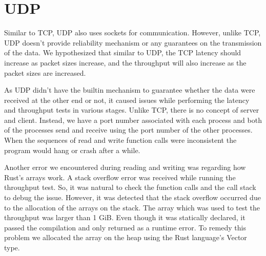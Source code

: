 
\section{UDP}

Similar to TCP, UDP also uses sockets for communication. However, unlike TCP, UDP doesn't provide reliability mechanism or any guarantees on the transmission of the data. We hypothesized that similar to UDP, the TCP latency should increase as packet sizes increase, and the throughput will also increase as the packet sizes are increased.

As UDP didn't have the builtin mechanism to guarantee whether the data were received at the other end or not, it caused issues while performing the latency and throughput tests in various stages. Unlike TCP, there is no concept of server and client. Instead, we have a port number associated with each process and both of the processes send and receive using the port number of the other processes. When the sequences of read and write function calls were inconsistent the program would hang or crash after a while.  

Another error we encountered during reading and writing was regarding how Rust's arrays work. A stack overflow error was received while running the throughput test. So, it was natural to check the function calls and the call stack to debug the issue. However, it was detected that the stack overflow occurred due to the allocation of the arrays on the stack. The array which was used to test the throughput was larger than 1 GiB. Even though it was statically declared, it passed the compilation and only returned as a runtime error. To remedy this problem we allocated the array on the heap using the Rust language's Vector type.

